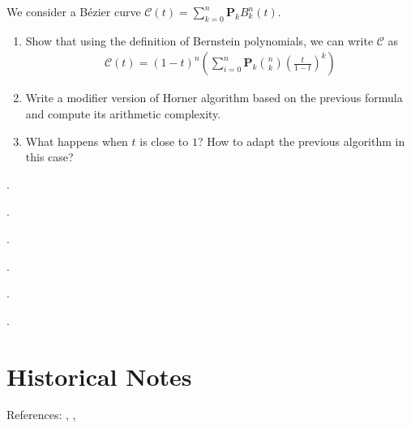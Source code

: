 \begin{exercise}
  We consider a B\'ezier curve $\mathcal{C}(t) = \sum_{k=0}^n \mathbf{P}_k B_k^n(t)$. 
  \\
  \begin{enumerate}
    \item  Show that using the definition of Bernstein polynomials, we can write $\mathcal{C}$ as
      \begin{align*}
        \mathcal{C}(t) = \left( 1-t \right)^n \left( \sum\limits_{i=0}^n \mathbf{P}_k \binom{n}{k} \left( \frac{t}{1-t} \right)^k \right)
      \end{align*}
    \item Write a modifier version of Horner algorithm based on the previous formula and compute its arithmetic complexity. 
    \item What happens when $t$ is close to $1$? How to adapt the previous algorithm in this case? 
  \end{enumerate}
\end{exercise}

\begin{exercise}
  .
\end{exercise}

\begin{exercise}
  .
\end{exercise}

\begin{exercise}
  .
\end{exercise}

\begin{exercise}
  .
\end{exercise}

\begin{exercise}
  .
\end{exercise}

\begin{exercise}
  .
\end{exercise}




\chapter{Historical Notes}
\label{ch:cad-historical-notes}

References: \cite{PieglBook1996}, \cite{DeBoor_Book2001}, \cite{farin2002curves, farin1999nurbs, prautzsch2002bezier,rogers2001introduction,cohen2001geometric}


